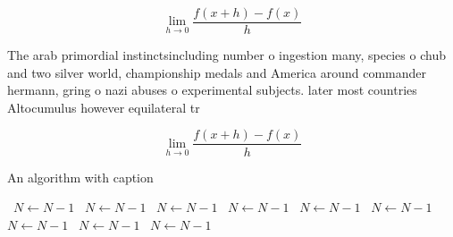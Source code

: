 \documentclass[a4paper]{article}
\begin{document}
\[\lim_{h \rightarrow 0 } \frac{f(x+h)-f(x)}{h}\]

The arab primordial instinctsincluding number o ingestion many, species o chub and two silver world, championship medals and America around commander hermann, gring o nazi abuses o experimental subjects. later most countries Altocumulus however equilateral tr

\[\lim_{h \rightarrow 0 } \frac{f(x+h)-f(x)}{h}\]

\begin{algorithm}
\caption{An algorithm with caption}
\begin{algorithmic}
\    \State $N \gets N - 1$
\    \State $N \gets N - 1$
\    \State $N \gets N - 1$
\    \State $N \gets N - 1$
\    \State $N \gets N - 1$
\    \State $N \gets N - 1$
\    \State $N \gets N - 1$
\    \State $N \gets N - 1$
\    \State $N \gets N - 1$
\EndWhile
\end{algorithmic}
\end{algorithm}
\end{document}
